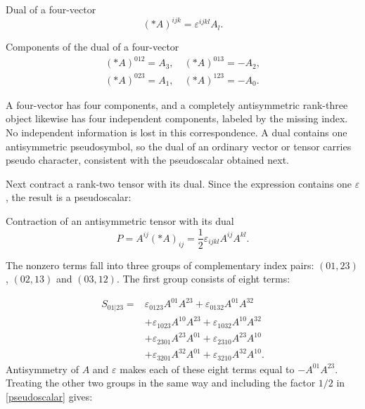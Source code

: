 \documentclass[a4paper,12pt]{article}
\begin{document}
\begin{definitionBox}{Dual of a four-vector}
\begin{equation}\label{dual-three}
(*A)^{ijk}=\varepsilon^{ijkl}A_l.
\end{equation}
\end{definitionBox}

\begin{resultBox}{Components of the dual of a four-vector}
\begin{equation}\label{dual-vector}
\begin{gathered}(*A)^{012}=A_3,\quad (*A)^{013}=-A_2,\\(*A)^{023}=A_1,\quad (*A)^{123}=-A_0.\end{gathered}
\end{equation}
\end{resultBox}

A four-vector has four components, and a completely antisymmetric rank-three object likewise has four independent components, labeled by the missing index. No independent information is lost in this correspondence. A dual contains one antisymmetric pseudosymbol, so the dual of an ordinary vector or tensor carries pseudo character, consistent with the pseudoscalar obtained next.

Next contract a rank-two tensor with its dual. Since the expression contains one $\varepsilon$, the result is a pseudoscalar:

\begin{definitionBox}{Contraction of an antisymmetric tensor with its dual}
\begin{equation}\label{pseudoscalar}
P=A^{ij}(*A)_{ij}=\frac12\varepsilon_{ijkl}A^{ij}A^{kl}.
\end{equation}
\end{definitionBox}
The nonzero terms fall into three groups of complementary index pairs: $(01,23)$, $(02,13)$ and $(03,12)$. The first group consists of eight terms:

\begin{equation}\label{eight-terms}
\begin{aligned}S_{01|23}={}&\varepsilon_{0123}A^{01}A^{23}+\varepsilon_{0132}A^{01}A^{32}\\&+\varepsilon_{1023}A^{10}A^{23}+\varepsilon_{1032}A^{10}A^{32}\\&+\varepsilon_{2301}A^{23}A^{01}+\varepsilon_{2310}A^{23}A^{10}\\&+\varepsilon_{3201}A^{32}A^{01}+\varepsilon_{3210}A^{32}A^{10}.\end{aligned}
\end{equation}
Antisymmetry of $A$ and $\varepsilon$ makes each of these eight terms equal to $-A^{01}A^{23}$. Treating the other two groups in the same way and including the factor $1/2$ in \eqref{pseudoscalar} gives:
\end{document}
